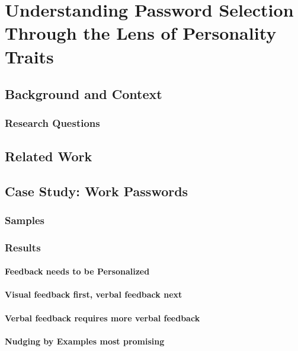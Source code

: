 \chapter[Understanding Password Selection Through the Lens of Personality Traits]{Understanding Password Selection Through the Lens of Personality Traits}\label{chap:pws_and_personality}


\section{Background and Context}

\subsection{Research Questions}

\section{Related Work}

\section{Case Study: Work Passwords}

\subsection{Samples}
\subsection{Results}

\subsubsection{Feedback needs to be Personalized}
\subsubsection{Visual feedback first, verbal feedback next}
\subsubsection{Verbal feedback requires more verbal feedback}
\subsubsection{Nudging by Examples most promising}


